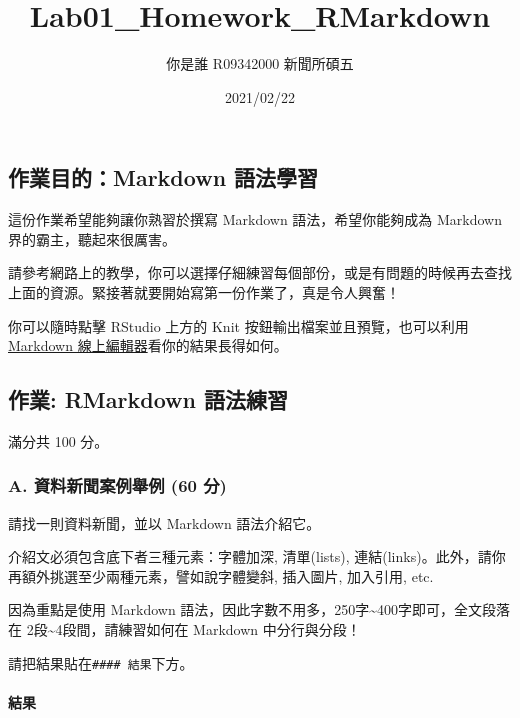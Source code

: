 \documentclass[
]{article}
\title{Lab01\_Homework\_RMarkdown}
\author{你是誰 R09342000 新聞所碩五}
\date{2021/02/22}
\begin{document}
\maketitle

{
\setcounter{tocdepth}{2}
\tableofcontents
}
\hypertarget{ux4f5cux696dux76eeux7684markdown-ux8a9eux6cd5ux5b78ux7fd2}{%
\subsection{作業目的：Markdown
語法學習}\label{ux4f5cux696dux76eeux7684markdown-ux8a9eux6cd5ux5b78ux7fd2}}

這份作業希望能夠讓你熟習於撰寫 Markdown 語法，希望你能夠成為 Markdown
界的霸主，聽起來很厲害。

請參考網路上的教學，你可以選擇仔細練習每個部份，或是有問題的時候再去查找上面的資源。緊接著就要開始寫第一份作業了，真是令人興奮！

你可以隨時點擊 RStudio 上方的 Knit 按鈕輸出檔案並且預覽，也可以利用
\href{https://jbt.github.io/markdown-editor}{Markdown
線上編輯器}看你的結果長得如何。

\hypertarget{ux4f5cux696d-rmarkdown-ux8a9eux6cd5ux7df4ux7fd2}{%
\subsection{作業: RMarkdown
語法練習}\label{ux4f5cux696d-rmarkdown-ux8a9eux6cd5ux7df4ux7fd2}}

滿分共 100 分。

\hypertarget{a.-ux8cc7ux6599ux65b0ux805eux6848ux4f8bux8209ux4f8b-60-ux5206}{%
\subsubsection{A. 資料新聞案例舉例 (60
分)}\label{a.-ux8cc7ux6599ux65b0ux805eux6848ux4f8bux8209ux4f8b-60-ux5206}}

請找一則資料新聞，並以 Markdown 語法介紹它。

介紹文必須包含底下者三種元素：字體加深, 清單(lists),
連結(links)。此外，請你再額外挑選至少兩種元素，譬如說字體變斜, 插入圖片,
加入引用, etc.

因為重點是使用 Markdown
語法，因此字數不用多，250字\textasciitilde400字即可，全文段落在
2段\textasciitilde4段間，請練習如何在 Markdown 中分行與分段！

請把結果貼在\texttt{\#\#\#\#\ 結果}下方。

\hypertarget{ux7d50ux679c}{%
\paragraph{結果}\label{ux7d50ux679c}}
\end{document}
